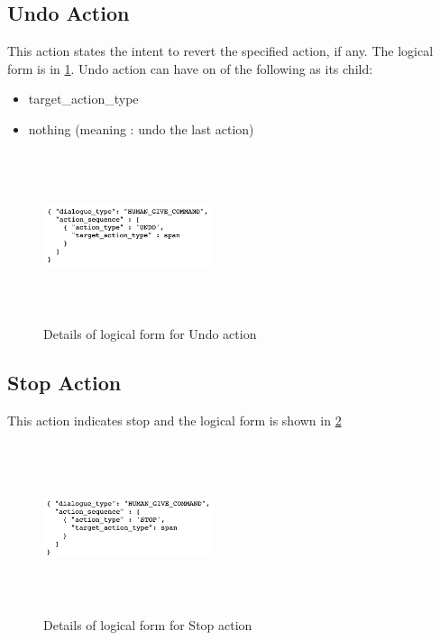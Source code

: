 \subsection{ Undo Action}
This action states the intent to revert the specified action, if any. The logical form is in \ref{fig:undo_dict}.
Undo action can have on of the following as its child:
\begin{itemize}
	\setlength\itemsep{0.0em}
	\item target\_action\_type 
	\item nothing (meaning : undo the last action)
\end{itemize}
\begin{figure}[h]
    \centering
    \includegraphics[width=5cm,height=5cm,keepaspectratio]{figures/undo.png}
    \caption{Details of logical form for Undo action}
    \label{fig:undo_dict}
\end{figure}

\subsection{ Stop Action}
This action indicates stop and the logical form is shown in \ref{fig:stop_dict}
\begin{figure}[h]
    \centering
    \includegraphics[width=5cm,height=5cm,keepaspectratio]{figures/stop.png}
    \caption{Details of logical form for Stop action}
    \label{fig:stop_dict}
\end{figure}

